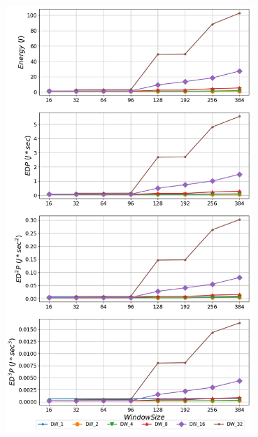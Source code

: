    \begin{minipage}{\textwidth}
      \begin{center}
         \\
         \vspace{3mm}
         \includegraphics[width=0.7\textwidth]{./graphs/edp/gobmk.png}
         \vspace{6mm}
      \end{center}
   \end{minipage}

